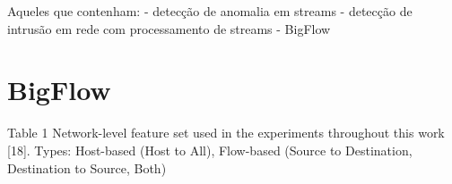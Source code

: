 \cite{Lopez2018}

Aqueles que contenham:
    - detecção de anomalia em streams
    - detecção de intrusão em rede com processamento de streams
    - BigFlow


\section{BigFlow}

Table 1
Network-level feature set used in the experiments throughout this work [18].
Types: Host-based (Host to All), Flow-based (Source to Destination, Destination to Source, Both)


